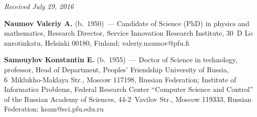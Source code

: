 \hfill{\small\textit{Received July 29, 2016}}

\vspace*{-12pt}


\Contr

\noindent
\textbf{Naumov Valeriy A.} (b.\ 1950)~--- Candidate of Science (PhD) in physics and 
mathematics, Research Director, Service Innovation Research Institute, 30~D 
L$\ddot{\mbox{o}}$nnrotinkatu, Helsinki 00180, Finland; \mbox{valeriy.naumov@pfu.fi} 

\vspace*{3pt}

\noindent
\textbf{Samouylov Konstantin E.} (b.\ 1955)~--- Doctor of Science in technology, 
professor, 
Head of Department, Peoples' Friendship University of Russia, 6~Miklukho-Maklaya Str., 
Moscow 117198, Russian Federation; Institute of Informatics Problems, Federal Research 
Center ``Computer Science and Control'' of the Russian Academy of Sciences, 44-2~Vavilov 
Str., Moscow 119333, Russian Federation; \mbox{ksam@sci.pfu.edu.ru}
\label{end\stat}


\renewcommand{\bibname}{\protect\rm Литература}